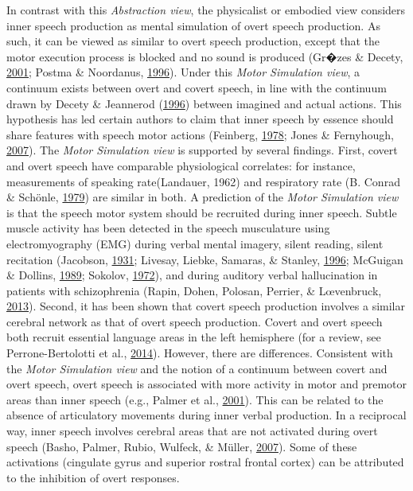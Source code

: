 \documentclass[a4paper,12pt,twoside,openright,oldfontcommands]{memoir}
\begin{document}
In contrast with this \emph{Abstraction view}, the physicalist or
embodied view considers inner speech production as mental simulation of
overt speech production. As such, it can be viewed as similar to overt
speech production, except that the motor execution process is blocked
and no sound is produced (Gr�zes \& Decety,
\protect\hyperlink{ref-grzes_functional_2001}{2001}; Postma \&
Noordanus, \protect\hyperlink{ref-postma_production_1996}{1996}). Under
this \emph{Motor Simulation view}, a continuum exists between overt and
covert speech, in line with the continuum drawn by Decety \& Jeannerod
(\protect\hyperlink{ref-decety_mentally_1996}{1996}) between imagined
and actual actions. This hypothesis has led certain authors to claim
that inner speech by essence should share features with speech motor
actions (Feinberg,
\protect\hyperlink{ref-feinberg_efference_1978}{1978}; Jones \&
Fernyhough, \protect\hyperlink{ref-Jones2007}{2007}). The \emph{Motor
Simulation view} is supported by several findings. First, covert and
overt speech have comparable physiological correlates: for instance,
measurements of speaking rate(Landauer, 1962) and respiratory rate (B.
Conrad \& Schönle, \protect\hyperlink{ref-conrad_speech_1979}{1979}) are
similar in both. A prediction of the \emph{Motor Simulation view} is
that the speech motor system should be recruited during inner speech.
Subtle muscle activity has been detected in the speech musculature using
electromyography (EMG) during verbal mental imagery, silent reading,
silent recitation (Jacobson,
\protect\hyperlink{ref-jacobson_electrical_1931}{1931}; Livesay, Liebke,
Samaras, \& Stanley, \protect\hyperlink{ref-livesay_covert_1996}{1996};
McGuigan \& Dollins,
\protect\hyperlink{ref-mcguigan_patterns_1989}{1989}; Sokolov,
\protect\hyperlink{ref-sokolov_inner_1972}{1972}), and during auditory
verbal hallucination in patients with schizophrenia (Rapin, Dohen,
Polosan, Perrier, \& Lœvenbruck,
\protect\hyperlink{ref-Rapin2013}{2013}). Second, it has been shown that
covert speech production involves a similar cerebral network as that of
overt speech production. Covert and overt speech both recruit essential
language areas in the left hemisphere (for a review, see
Perrone-Bertolotti et al.,
\protect\hyperlink{ref-Perrone-Bertolotti2014}{2014}). However, there
are differences. Consistent with the \emph{Motor Simulation view} and
the notion of a continuum between covert and overt speech, overt speech
is associated with more activity in motor and premotor areas than inner
speech (e.g., Palmer et al.,
\protect\hyperlink{ref-palmer_event-related_2001}{2001}). This can be
related to the absence of articulatory movements during inner verbal
production. In a reciprocal way, inner speech involves cerebral areas
that are not activated during overt speech (Basho, Palmer, Rubio,
Wulfeck, \& Müller, \protect\hyperlink{ref-basho_effects_2007}{2007}).
Some of these activations (cingulate gyrus and superior rostral frontal
cortex) can be attributed to the inhibition of overt responses.
\end{document}
